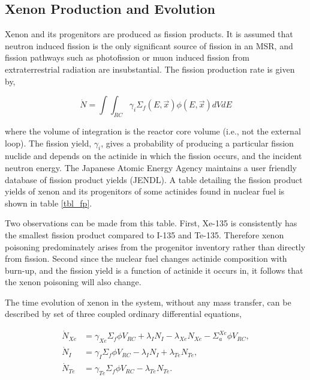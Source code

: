 \subsection{Xenon Production and Evolution}

Xenon and its progenitors are produced as fission products.  It is assumed that neutron induced fission is the only significant source of fission in an MSR, and fission pathways such as photofission or muon induced fission from extraterrestrial radiation are insubstantial.  The fission production rate is given by,

\begin{equation}
    \dot{N} = \int \int_{RC} \gamma_i \Sigma_f(E,\vec{x}) \phi(E,\vec{x}) dV dE
\end{equation}

where the volume of integration is the reactor core volume (i.e., not the external loop).  The fission yield, $\gamma_i$,  gives a probability of producing a particular fission nuclide and depends on the actinide in which the fission occurs, and the incident neutron energy.  The Japanese Atomic Energy Agency maintains a user friendly database of fission product yields (JENDL). \cite{JENDLFP}  A table detailing the fission product yields of xenon and its progenitors of some actinides found in nuclear fuel is shown in table \ref{tbl_fp}.

Two observations can be made from this table.  First, Xe-135 is consistently has the smallest fission product compared to I-135 and Te-135.  Therefore  xenon poisoning predominately arises from the progenitor inventory rather than directly from fission. Second since the nuclear fuel changes actinide composition with burn-up, and the fission yield is a function of actinide it occurs in, it follows that the xenon poisoning will also change.

The time evolution of xenon in the system, without any mass transfer, can be described by set of three coupled ordinary differential equations,

\begin{subequations}
\begin{align}
\dot{N}_{Xe} &=  \gamma_{Xe} \Sigma_f \phi V_{RC} + \lambda_I N_I -\lambda_{Xe} N_{Xe} - \Sigma_a^{Xe} \phi V_{RC}, \\
\dot{N}_I &=\gamma_{I} \Sigma_f \phi V_{RC} - \lambda_I N_I + \lambda_{Te} N_{Te}, \\
\dot{N}_{Te} &= \gamma_{Te} \Sigma_f \phi V_{RC} - \lambda_{Te} N_{Te} .
\end{align}
\end{subequations}

